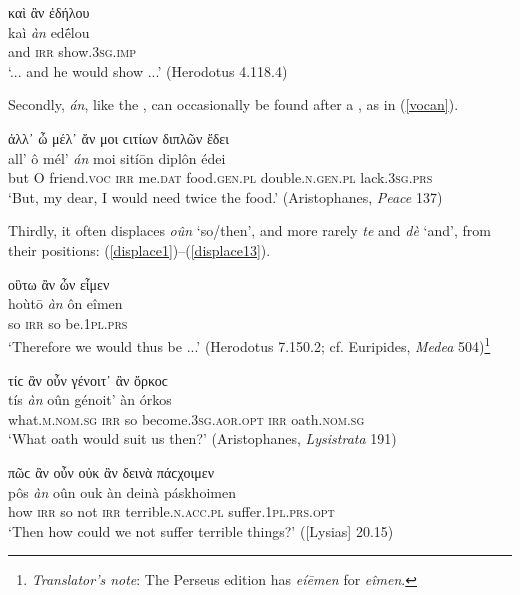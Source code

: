 \begin{exe}
\ex καὶ ἂν ἐδήλου\\
\gll kaì \emph{àn} edḗlou\\
and \textsc{irr} show.\textsc{3sg.imp}\\
\trans `... and he would show ...' (Herodotus 4.118.4)
\label{kaian}
\end{exe}

Secondly, \emph{án}, like the , can occasionally be found after a , as in (\ref{vocan}).

\begin{exe}
\ex ἀλλ᾽ ὦ μέλ᾽ ἄν μοι ϲιτίων διπλῶν ἔδει\\
\gll all' ô mél' \emph{án} moi sitíōn diplôn édei\\
but O friend.\textsc{voc} \textsc{irr} me.\textsc{dat} food.\textsc{gen.pl} double.\textsc{n.gen.pl} lack.\textsc{3sg.prs}\\
\trans `But, my dear, I would need twice the food.' (Aristophanes, \textit{Peace} 137)
\label{vocan}
\end{exe}

Thirdly, it often displaces \emph{oûn} `so/then', and more rarely \emph{te} and \emph{dè} `and', from their positions: (\ref{displace1})--(\ref{displace13}).

\begin{exe}
\ex οὓτω ἂν ὦν εἶμεν\\
\gll hoùtō \emph{àn} ôn eîmen\\
so \textsc{irr} so be.\textsc{1pl.prs}\\
\trans `Therefore we would thus be ...' (Herodotus 7.150.2; cf. Euripides, \textit{Medea} 504)\footnote{\emph{Translator's note}: The Perseus edition has \textit{eíēmen} for \textit{eîmen}.}
\label{displace1}
\end{exe}

\begin{exe}
\ex τίϲ ἂν οὖν γένοιτ᾽ ἂν ὄρκοϲ\\
\gll tís \emph{àn} oûn génoit' àn órkos\\
what.\textsc{m.nom.sg} \textsc{irr} so become.\textsc{3sg.aor.opt} \textsc{irr} oath.\textsc{nom.sg}\\
\trans `What oath would suit us then?' (Aristophanes, \textit{Lysistrata} 191)
\label{displace2}
\end{exe}

\begin{exe}
\ex πῶϲ ἂν οὖν οὐκ ἂν δεινὰ πάϲχοιμεν\\
\gll pôs \emph{àn} oûn ouk àn deinà páskhoimen\\
how \textsc{irr} so not \textsc{irr} terrible.\textsc{n.acc.pl} suffer.\textsc{1pl.prs.opt}\\
\trans `Then how could we not suffer terrible things?' ({[}Lysias{]} 20.15)
\label{displace3}
\end{exe}

